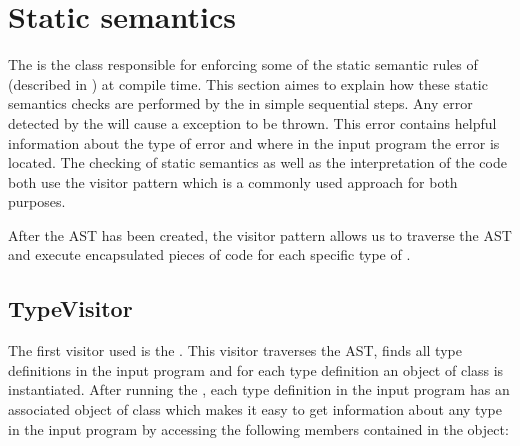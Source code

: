 \section{Static semantics}
\label{sec:staticsemantics}

The  is the class responsible for enforcing some of the
static semantic rules of \productname{} (described in ) at
compile time. This section aimes to explain how these static semantics checks
are performed by the  in simple sequential steps. Any
error detected by the  will cause a 
exception to be thrown. This error contains helpful information about the type
of error and where in the input program the error is located. The checking of
static semantics as well as the interpretation of the code both use the visitor
pattern which is a commonly used approach for both purposes.

After the AST has been created, the visitor pattern allows us to traverse the
AST and execute encapsulated pieces of code for each specific type of
. 

\subsection{TypeVisitor}
The first visitor used is the . This visitor traverses the
AST, finds all type definitions in the input program and for each type
definition an object of class  is instantiated. After
running the , each type definition in the input program
has an associated object of class  which makes it easy
to get information about any type in the input program by accessing the
following members contained in the  object:

